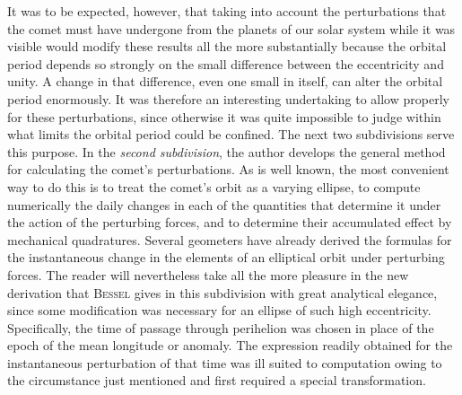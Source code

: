 It was to be expected, however, that taking into account the perturbations that the comet must have undergone from the planets of our solar system while it was visible would modify these results all the more substantially because the orbital period depends so strongly on the small difference between the eccentricity and unity. A change in that difference, even one small in itself, can alter the orbital period enormously. It was therefore an interesting undertaking to allow properly for these perturbations, since otherwise it was quite impossible to judge within what limits the orbital period could be confined. The next two subdivisions serve this purpose. In the \emph{second subdivision}, the author develops the general method for calculating the comet's perturbations. As is well known, the most convenient way to do this is to treat the comet's orbit as a varying ellipse, to compute numerically the daily changes in each of the quantities that determine it under the action of the perturbing forces, and to determine their accumulated effect by mechanical quadratures. Several geometers have already derived the formulas for the instantaneous change in the elements of an elliptical orbit under perturbing forces. The reader will nevertheless take all the more pleasure in the new derivation that \textsc{Bessel} gives in this subdivision with great analytical elegance, since some modification was necessary for an ellipse of such high eccentricity. Specifically, the time of passage through perihelion was chosen in place of the epoch of the mean longitude or anomaly. The expression readily obtained for the instantaneous perturbation of that time was ill suited to computation owing to the circumstance just mentioned and first required a special transformation.

